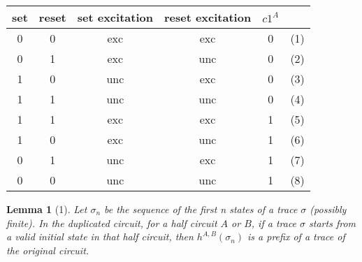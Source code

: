 \documentclass{article}
\newtheorem*{lemma}{Lemma}
\begin{document}
\begin{tabular}{ c | c | c | c |c|c}
  set & reset & set excitation & reset excitation & $c1^A$ \\
\hline
   0&0&exc&exc&0& (1)\\
   0&1&exc&unc&0 &(2)\\
   1&0&unc&exc&0 &(3)\\
   1&1&unc&unc&0 &(4)\\
   1&1&exc&exc&1 &(5)\\
   1&0&exc&unc&1 &(6)\\
   0&1&unc&exc&1 &(7)\\
   0&0&unc&unc&1 &(8)\\
\end{tabular}

\begin{lemma}[1]
Let $\sigma_n$ be the sequence of the first n states of a trace $\sigma$ (possibly finite).  In the duplicated circuit, for a half circuit $A$ or $B$, if a trace $\sigma$ starts from a valid initial state in that half circuit, then $h^{A,B}(\sigma_n)$ is a prefix of a trace of the original circuit.


\end{lemma}
\end{document}
